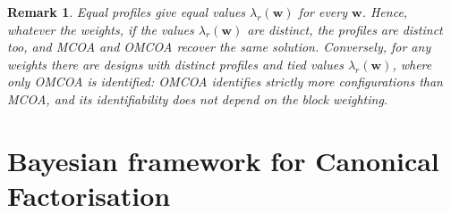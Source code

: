 \documentclass[11pt]{article}
\newtheorem{remark}{Remark}
\newcommand{\X}{\mathbf{X}}
\newcommand{\U}{\mathbf{U}}
\newcommand{\V}{\mathbf{V}}
\begin{document}
\begin{remark}
Equal profiles give equal values $\lambda_r(\mathbf w)$ for every $\mathbf w$. Hence, whatever the weights, if the values $\lambda_r(\mathbf w)$ are distinct, the profiles are distinct too, and MCOA and OMCOA recover the same solution. Conversely, for any weights there are designs with distinct profiles and tied values $\lambda_r(\mathbf w)$, where only OMCOA is identified: OMCOA identifies strictly more configurations than MCOA, and its identifiability does not depend on the block weighting.
\end{remark}





\section{Bayesian framework for Canonical Factorisation}
\end{document}
